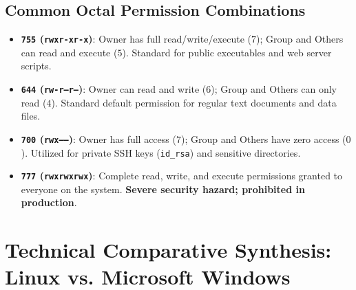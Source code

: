 \subsection{Common Octal Permission Combinations}
\begin{itemize}[leftmargin=1.5em]
    \item \textbf{\texttt{755} (\texttt{rwxr-xr-x})}: Owner has full read/write/execute ($7$); Group and Others can read and execute ($5$). Standard for public executables and web server scripts.
    \item \textbf{\texttt{644} (\texttt{rw-r--r--})}: Owner can read and write ($6$); Group and Others can only read ($4$). Standard default permission for regular text documents and data files.
    \item \textbf{\texttt{700} (\texttt{rwx------})}: Owner has full access ($7$); Group and Others have zero access ($0$). Utilized for private SSH keys (\texttt{id\_rsa}) and sensitive directories.
    \item \textbf{\texttt{777} (\texttt{rwxrwxrwx})}: Complete read, write, and execute permissions granted to everyone on the system. \textbf{Severe security hazard; prohibited in production}.
\end{itemize}

\section{Technical Comparative Synthesis: Linux vs. Microsoft Windows}

